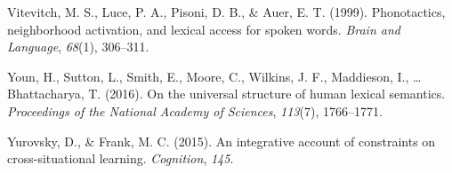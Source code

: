 \documentclass[english,floatsintext,man]{apa6}
\theoremstyle{definition}
\theoremstyle{definition}
\theoremstyle{definition}
\theoremstyle{remark}
\begin{document}
\hypertarget{ref-vitevitch1999}{}
Vitevitch, M. S., Luce, P. A., Pisoni, D. B., \& Auer, E. T. (1999).
Phonotactics, neighborhood activation, and lexical access for spoken
words. \emph{Brain and Language}, \emph{68}(1), 306--311.

\hypertarget{ref-youn2016}{}
Youn, H., Sutton, L., Smith, E., Moore, C., Wilkins, J. F., Maddieson,
I., \ldots{} Bhattacharya, T. (2016). On the universal structure of
human lexical semantics. \emph{Proceedings of the National Academy of
Sciences}, \emph{113}(7), 1766--1771.

\hypertarget{ref-yurovsky2015}{}
Yurovsky, D., \& Frank, M. C. (2015). An integrative account of
constraints on cross-situational learning. \emph{Cognition}, \emph{145}.
\end{document}

